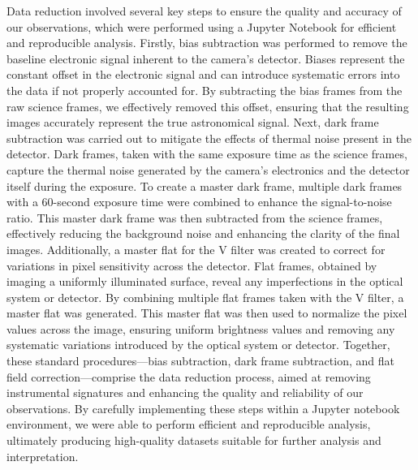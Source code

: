 \documentclass[]{aastex63}
\begin{document}
Data reduction involved several key steps to ensure the quality and accuracy of our observations, which were performed using a Jupyter Notebook for efficient and reproducible analysis. Firstly, bias subtraction was performed to remove the baseline electronic signal inherent to the camera's detector. Biases represent the constant offset in the electronic signal and can introduce systematic errors into the data if not properly accounted for. By subtracting the bias frames from the raw science frames, we effectively removed this offset, ensuring that the resulting images accurately represent the true astronomical signal. Next, dark frame subtraction was carried out to mitigate the effects of thermal noise present in the detector. Dark frames, taken with the same exposure time as the science frames, capture the thermal noise generated by the camera's electronics and the detector itself during the exposure. To create a master dark frame, multiple dark frames with a 60-second exposure time were combined to enhance the signal-to-noise ratio. This master dark frame was then subtracted from the science frames, effectively reducing the background noise and enhancing the clarity of the final images. Additionally, a master flat for the V filter was created to correct for variations in pixel sensitivity across the detector. Flat frames, obtained by imaging a uniformly illuminated surface, reveal any imperfections in the optical system or detector. By combining multiple flat frames taken with the V filter, a master flat was generated. This master flat was then used to normalize the pixel values across the image, ensuring uniform brightness values and removing any systematic variations introduced by the optical system or detector. Together, these standard procedures—bias subtraction, dark frame subtraction, and flat field correction—comprise the data reduction process, aimed at removing instrumental signatures and enhancing the quality and reliability of our observations. By carefully implementing these steps within a Jupyter notebook environment, we were able to perform efficient and reproducible analysis, ultimately producing high-quality datasets suitable for further analysis and interpretation.
\end{document}
